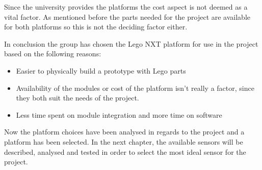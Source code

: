 Since the university provides the platforms the cost aspect is not deemed as a
vital factor. As mentioned before the parts needed for the project are
available for both platforms so this is not the deciding factor either.

In conclusion the group has chosen the Lego NXT platform for use in the project
based on the following reasons:
\begin{itemize}
  \item Easier to physically build a prototype with Lego parts
  \item Availability of the modules or cost of the platform isn't really a
  factor, since they both suit the needs of the project.
  \item Less time spent on module integration and more time on software
\end{itemize}

Now the platform choices have been analysed in regards to the project and a
platform has been selected. In the next chapter, the available sensors will be
described, analysed and tested in order to select the most ideal sensor for the
project.
